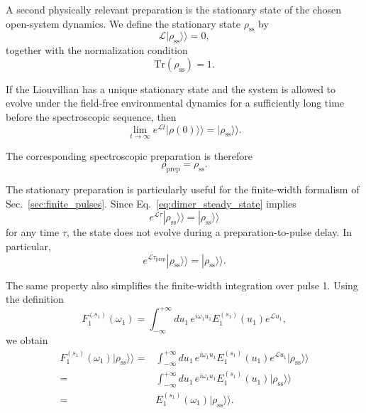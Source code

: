 \documentclass[11pt]{article}
\begin{document}
A second physically relevant preparation is the stationary state of
the chosen open-system dynamics. We define the stationary state
$\rho_{\mathrm{ss}}$ by
%
\begin{equation}
\boxed{
\mathcal{L}
|\rho_{\mathrm{ss}}\rangle\rangle
=
0,
}
\label{eq:dimer_steady_state}
\end{equation}
%
together with the normalization condition
%
\begin{equation}
\boxed{
\mathrm{Tr}
\left(
\rho_{\mathrm{ss}}
\right)
=
1.
}
\end{equation}

If the Liouvillian has a unique stationary state and the system is
allowed to evolve under the field-free environmental dynamics for a
sufficiently long time before the spectroscopic sequence, then
%
\begin{equation}
\lim_{t\rightarrow\infty}
e^{\mathcal{L}t}
|\rho(0)\rangle\rangle
=
|\rho_{\mathrm{ss}}\rangle\rangle .
\end{equation}

The corresponding spectroscopic preparation is therefore
%
\begin{equation}
\boxed{
\rho_{\mathrm{prep}}
=
\rho_{\mathrm{ss}}.
}
\label{eq:ss_initial_state}
\end{equation}

The stationary preparation is particularly useful for the finite-width
formalism of Sec.~\ref{sec:finite_pulses}. Since
Eq.~\eqref{eq:dimer_steady_state} implies
%
\begin{equation}
e^{\mathcal{L}\tau}
|\rho_{\mathrm{ss}}\rangle\rangle
=
|\rho_{\mathrm{ss}}\rangle\rangle
\end{equation}
%
for any time $\tau$, the state does not evolve during a
preparation-to-pulse delay. In particular,
%
\begin{equation}
\boxed{
e^{\mathcal{L}\tau_{\mathrm{prep}}}
|\rho_{\mathrm{ss}}\rangle\rangle
=
|\rho_{\mathrm{ss}}\rangle\rangle .
}
\label{eq:ss_prep_delay}
\end{equation}

The same property also simplifies the finite-width integration over
pulse 1. Using the definition
%
\begin{equation}
F_1^{(s_1)}(\omega_1)
=
\int_{-\infty}^{+\infty}
du_1\,
e^{i\omega_1u_1}
E_1^{(s_1)}(u_1)
e^{\mathcal{L}u_1},
\end{equation}
%
we obtain
%
\begin{align}
F_1^{(s_1)}(\omega_1)
|\rho_{\mathrm{ss}}\rangle\rangle
={}&
\int_{-\infty}^{+\infty}
du_1\,
e^{i\omega_1u_1}
E_1^{(s_1)}(u_1)
e^{\mathcal{L}u_1}
|\rho_{\mathrm{ss}}\rangle\rangle
\\
={}&
\int_{-\infty}^{+\infty}
du_1\,
e^{i\omega_1u_1}
E_1^{(s_1)}(u_1)
|\rho_{\mathrm{ss}}\rangle\rangle
\\
={}&
E_1^{(s_1)}(\omega_1)
|\rho_{\mathrm{ss}}\rangle\rangle .
\end{align}
\end{document}
